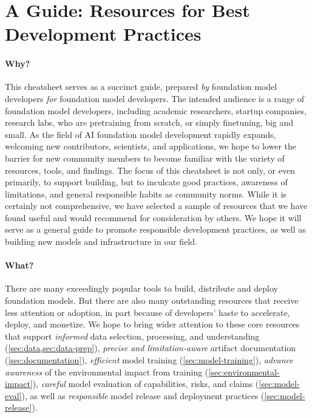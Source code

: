 \section*{A Guide: Resources for Best Development Practices}
\label{sec:guide}

\paragraph{Why?} 
This cheatsheet serves as a succinct guide, prepared \emph{by} foundation model developers \emph{for} foundation model developers.
The intended audience is a range of foundation model developers, including academic researchers, startup companies, research labs, who are pretraining from scratch, or simply finetuning, big and small.
As the field of AI foundation model development rapidly expands, welcoming new contributors, scientists, and applications, we hope to lower the barrier for new community members to become familiar with the variety of resources, tools, and findings.
The focus of this cheatsheet is not only, or even primarily, to support building, but to inculcate good practices, awareness of limitations, and general responsible habits as community norms.
While it is certainly not comprehensive, we have selected a sample of resources that we have found useful and would recommend for consideration by others.
We hope it will serve as a general guide to promote responsible development practices, as well as building new models and infrastructure in our field.

\paragraph{What?}
There are many exceedingly popular tools to build, distribute and deploy foundation models.
But there are also many outstanding resources that receive less attention or adoption, in part because of developers' haste to accelerate, deploy, and monetize.
We hope to bring wider attention to these core resources that support \emph{informed} data selection, processing, and understanding (\cref{sec:data,sec:data-prep}), \emph{precise and limitation-aware} artifact documentation (\cref{sec:documentation}), \emph{efficient} model training (\cref{sec:model-training}), \emph{advance awareness} of the environmental impact from training (\cref{sec:environmental-impact}), \emph{careful} model evaluation of capabilities, risks, and claims (\cref{sec:model-eval}), as well as \emph{responsible} model release and deployment practices (\cref{sec:model-release}).

